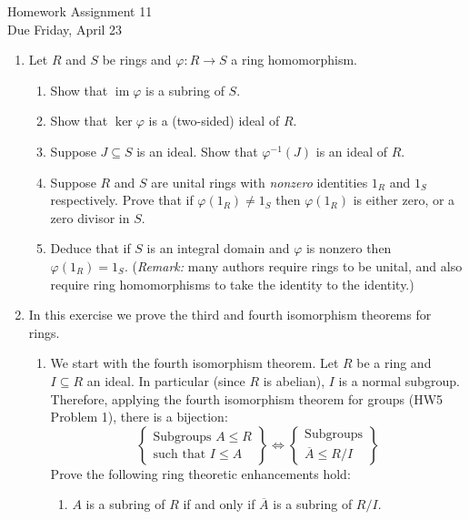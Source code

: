 \documentclass[11pt]{article}
\newcommand{\im}{\operatorname{im}}
\begin{document}
\begin{center}
  \Large {Homework Assignment 11}\\
  \small {Due Friday, April 23}
\end{center}
\begin{enumerate}
  \item{
  Let $R$ and $S$ be rings and $\varphi:R\to S$ a ring homomorphism.
  \begin{enumerate}
    \item{Show that $\im\varphi$ is a subring of $S$.}
    \item{Show that $\ker\varphi$ is a (two-sided) ideal of $R$.}
    \item{Suppose $J\subseteq S$ is an ideal.  Show that $\varphi^{-1}(J)$ is an ideal of $R$.}
    \item{Suppose $R$ and $S$ are unital rings with \textit{nonzero} identities $1_R$ and $1_S$ respectively.  Prove that if $\varphi(1_R)\not=1_S$ then $\varphi(1_R)$ is either zero, or a zero divisor in $S$.}
    \item{Deduce that if $S$ is an integral domain and $\varphi$ is nonzero then $\varphi(1_R)=1_S$.  (\textit{Remark:} many authors require rings to be unital, and also require ring homomorphisms to take the identity to the identity.)}
  \end{enumerate}
  }
  \item{
  In this exercise we prove the third and fourth isomorphism theorems for rings.
  \begin{enumerate}
    \item{We start with the fourth isomorphism theorem.  Let $R$ be a ring and $I\subseteq R$ an ideal.  In particular (since $R$ is abelian), $I$ is a normal subgroup.  Therefore, applying the fourth isomorphism theorem for groups (HW5 Problem 1), there is a bijection:
    \[\left\{
    \begin{array}{c}
      \text{Subgroups }A\le R\\
      \text{such that }I\le A
    \end{array}\right\}
    \Longleftrightarrow
    \left\{
    \begin{array}{c}
      \text{Subgroups}\\
      \overline{A}\le R/I
    \end{array}
    \right\}
    \]
    Prove the following ring theoretic enhancements hold:
    \begin{enumerate}
      \item{$A$ is a subring of $R$ if and only if $\overline A$ is a subring of $R/I$.}

\end{enumerate}}
\end{enumerate}}
\end{enumerate}
\end{document}
